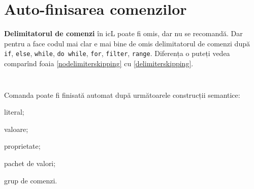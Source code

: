 \section{Auto-finisarea comenzilor}

\textbf{Delimitatorul de comenzi} în icL poate fi omis, dar nu se recomandă. Dar pentru a face codul mai clar e mai bine de omis delimitatorul de comenzi după \texttt{if}, \texttt{else}, \texttt{while}, \texttt{do while}, \texttt{for}, \texttt{filter}, \texttt{range}. Diferența o puteți vedea comparînd foaia \ref{nodelimiterskipping} cu  \ref{delimiterskipping}.

\begin{sourcecode}
    \label{nodelimiterskipping}
    \inputminted[linenos]{icl}{../sources/nodelimiterskipping.icL}
\end{sourcecode}

\begin{sourcecode}
    \label{delimiterskipping}
    \inputminted[linenos]{icl}{../sources/delimiterskipping.icL}
\end{sourcecode}

Comanda poate fi finisată automat după următoarele construcții semantice:
\begin{icItems}
	\item literal;
	\item valoare;
	\item proprietate;
	\item pachet de valori;
	\item grup de comenzi.
\end{icItems}
